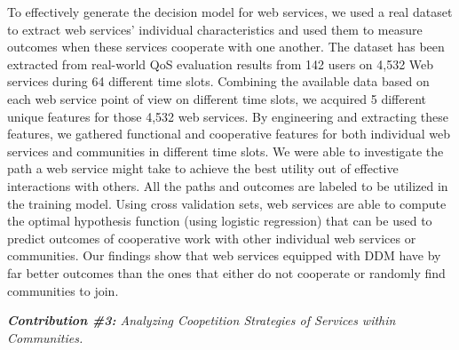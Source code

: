 To effectively generate the decision model for web services, we used a real dataset to extract web services' individual characteristics and used them to measure outcomes when these services cooperate with one another. The dataset has been extracted from real-world QoS evaluation results from 142 users on 4,532 Web services during 64 different time slots. Combining the available data based on each web service point of view on different time slots, we acquired 5 different unique features for those 4,532 web services. By engineering and extracting these features, we gathered functional and cooperative features for both individual web services and communities in different time slots. We were able to investigate the path a web service might take to achieve the best utility out of effective interactions with others. All the paths and outcomes are labeled to be utilized in the training model. Using cross validation sets, web services are able to compute the optimal hypothesis function (using logistic regression) that can be used to predict outcomes of cooperative work with other individual web services or communities. Our findings show that web services equipped with DDM have by far better outcomes than the ones that either do not cooperate or randomly find communities to join.


\noindent \emph{\textbf{Contribution \#3:} Analyzing Coopetition Strategies of Services within Communities\cite{DBLP:journals/eswa/AslBMKO14}.}


